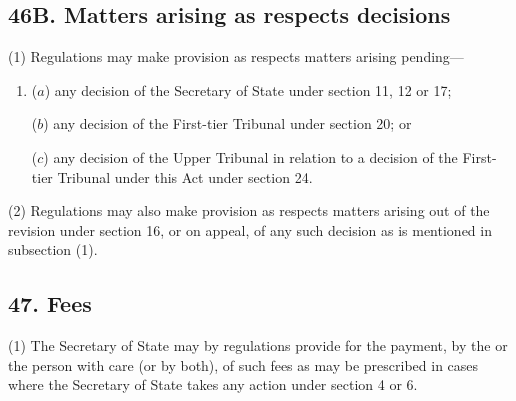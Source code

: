 \documentclass[12pt,a4paper]{article}
\begin{document}
\subsection{46B. Matters arising as respects decisions}

(1) Regulations may make provision as respects matters arising pending---
\begin{enumerate}\item[]
($a$) any decision of the Secretary of State under section 11, 12 or 17;

($b$) any decision of the First-tier Tribunal under section 20; or

($c$) any decision of the Upper Tribunal in relation to a decision of the First-tier
Tribunal under this Act under section 24.
\end{enumerate}

(2) Regulations may also make provision as respects matters arising out of the
revision under section 16, or on appeal, of any such decision as is mentioned in
subsection (1).



\subsection{47. Fees}

(1) The Secretary of State may by regulations provide for the payment, by
the  or the person with care (or by both), of such
fees as may be prescribed in cases where the Secretary of State takes%
 any action under section 4 or 6.
\end{document}
